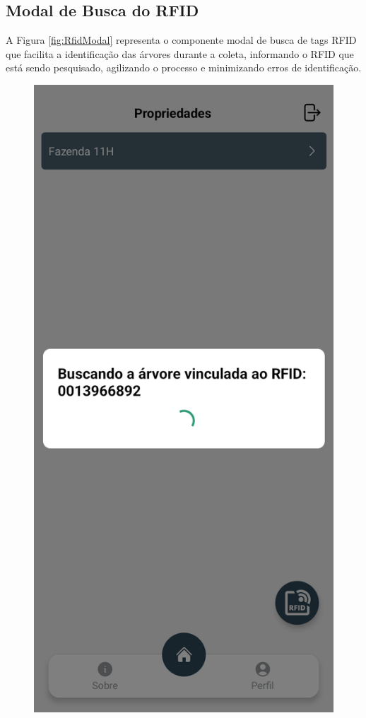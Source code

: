 \subsection{Modal de Busca do RFID}
A Figura \ref{fig:RfidModal} representa o componente modal de busca de tags RFID que facilita a identificação das árvores durante a coleta, informando o RFID que está sendo pesquisado, agilizando o processo e minimizando erros de identificação. 

\begin{figure}[htb]
    \centering
    \begin{minipage}[b]{0.30\textwidth}
        \centering
        \includegraphics[width=\textwidth]{images/app/rfid-modal.png}

\end{minipage}
\end{figure}
